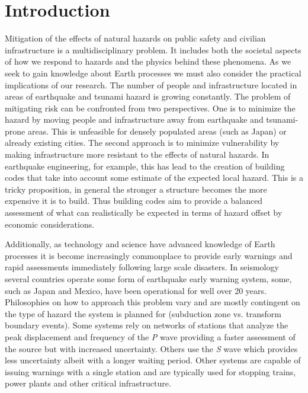 
\chapter{Introduction}

Mitigation of the effects of natural hazards on public safety and civilian infrastructure is a multidisciplinary problem. It includes both the societal aspects of how we respond to hazards and the physics behind these phenomena. As we seek to gain knowledge about Earth processes we must also consider the practical implications of our research. The number of people and infrastructure located in areas of earthquake and tsunami hazard is growing constantly. The problem of mitigating risk can be confronted from two perspectives. One is to minimize the hazard by moving people and infrastructure away from earthquake and tsunami-prone areas. This is unfeasible for densely populated areas (such as Japan) or already existing cities. The second approach is to minimize vulnerability by making infrastructure more resistant to the effects of natural hazards. In earthquake engineering, for example, this has lead to the creation of building codes that take into account some estimate of the expected local hazard. This is a tricky proposition, in general the stronger a structure becomes the more expensive it is to build. Thus building codes aim to provide a balanced assessment of what can realistically be expected in terms of hazard offset by economic considerations.

Additionally, as technology and science have advanced knowledge of Earth processes it is become increasingly commonplace to provide early warnings and rapid assessments immediately following large scale disasters. In seismology several countries operate some form of earthquake early warning \citep{allen2009} system, some, such as Japan and Mexico, have been operational for well over 20 years. Philosophies on how to approach this problem vary and are mostly contingent on the type of hazard the system is planned for (subduction zone vs. transform boundary events). Some systems rely on networks of stations that analyze the peak displacement and frequency of the \textit{P} wave \citep{kamigaichi2009} providing a faster assessment of the source but with increased uncertainty. Others use the \textit{S} wave \citep{espinosa2009} which provides less uncertainty albeit with a longer waiting period. Other systems are capable of issuing warnings with a single station \citep{nakamura2007} and are typically used for stopping trains, power plants and other critical infrastructure.

